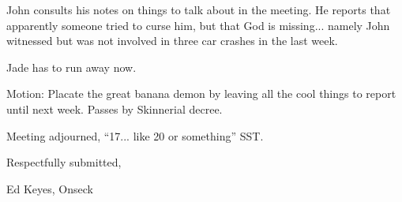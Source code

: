 \documentclass[12pt]{article}
\begin{document}
John consults his notes on things to talk about in the meeting.  He
reports that apparently someone tried to curse him, but that God is
missing... namely John witnessed but was not involved in three car
crashes in the last week.

Jade has to run away now.

Motion: Placate the great banana demon by leaving all the cool things
to report until next week.  Passes by Skinnerial decree.

\vspace{12pt}

\noindent
Meeting adjourned, ``17... like 20 or something'' SST.

\vspace{18pt}

\centerline{Respectfully submitted,}
\centerline{Ed Keyes, Onseck}
\end{document}
